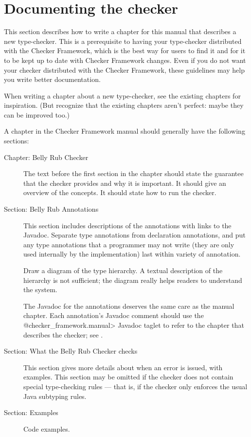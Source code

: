 \section{Documenting the checker\label{documenting-a-checker}}

This section describes how to write a chapter for this manual that
describes a new type-checker.  This is a prerequisite to having your
type-checker distributed with the Checker Framework, which is the best way
for users to find it and for it to be kept up to date with Checker
Framework changes.  Even if you do not want your checker distributed with
the Checker Framework, these guidelines may help you write better
documentation.

When writing a chapter about a new type-checker, see the existing chapters
for inspiration.  (But recognize that the existing chapters aren't perfect:
maybe they can be improved too.)

A chapter in the Checker Framework manual should generally have the
following sections:

\begin{description}
\item[Chapter: Belly Rub Checker]
  The text before the first section in the chapter should state the
  guarantee that the checker provides and why it is important.  It should
  give an overview of the concepts.  It should state how to run the checker.
\item[Section: Belly Rub Annotations]
  This section includes descriptions of the annotations with links to the
  Javadoc.  Separate type annotations from declaration annotations, and put
  any type annotations that a programmer may not write (they are only used
  internally by the implementation) last within variety of annotation.

  Draw a diagram of the type hierarchy.  A textual description of
  the hierarchy is not sufficient; the diagram really helps readers to
  understand the system.

  The Javadoc for the annotations deserves the same care as the manual
  chapter.  Each annotation's Javadoc comment should use the
  \<@checker\_framework.manual> Javadoc taglet to refer to the chapter that
  describes the checker; see .
\item[Section: What the Belly Rub Checker checks]
  This section gives more details about when an error is issued, with examples.
  This section may be omitted if the checker does not contain special
  type-checking rules --- that is, if the checker only enforces the usual
  Java subtyping rules.
\item[Section: Examples]
  Code examples.
\end{description}

